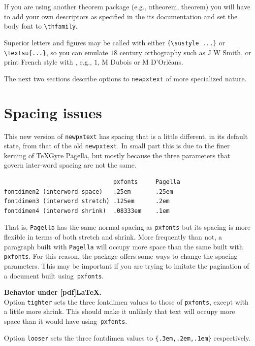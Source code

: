 \documentclass[11pt]{article}
\theoremstyle{oldplain}
\theoremstyle{plain}
\begin{document}
If you are using another theorem package (e.g., ntheorem, theorem) you will have to add your own descriptors as specified in the its documentation and set the body font to \verb|\thfamily|.

Superior letters and figures may be called with either \verb|{\sustyle ...}| or \verb|\textsu{...}|, so you can emulate $18$ century orthography such as J W Smith, or print French style with , e.g., $1$, M Dubois or M D'Orl\'eans.

The next two sections describe options to {\tt newpxtext} of more specialized nature.

\section{Spacing issues}%
This new version of {\tt newpxtext} has spacing that is a little different, in its default state, from that of the old {\tt newpxtext}. In small part this is due to the finer kerning of TeXGyre Pagella, but mostly because the three parameters that govern inter-word spacing are not the same.
\begin{verbatim}
                               pxfonts     Pagella
fontdimen2 (interword space)   .25em       .25em
fontdimen3 (interword stretch) .125em      .2em
fontdimen4 (interword shrink)  .08333em    .1em
\end{verbatim}
That is, {\tt Pagella} has the same normal spacing as {\tt pxfonts} but its spacing is more flexible in terms of both stretch and shrink. More frequently than not, a paragraph built with {\tt Pagella} will occupy more space than the same built with {\tt pxfonts}. For this reason, the package offers some ways to change the spacing parameters. This may be important if you are trying to imitate the pagination of a document built using~{\tt pxfonts}.

\textbf{Behavior under [pdf]LaTeX.}\\
Option {\tt tighter} sets the three fontdimen values to those of {\tt pxfonts}, except with a little more shrink. This should make it unlikely that text will occupy more space than it would have using~{\tt pxfonts}. 

Option {\tt looser} sets the three fontdimen values to \verb|{.3em,.2em,.1em}| respectively. 
\end{document}
